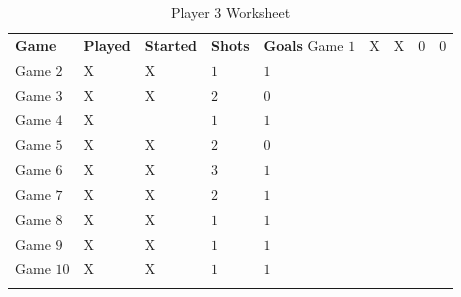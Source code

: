 \begin{table}[H]
	{\small
		\begin{longtable}{L{0.65in}C{0.45in}C{0.50in}C{0.40in}C{0.40in}} %
			\textbf{Game} & \textbf{Played} & \textbf{Started} & \textbf{Shots} & \textbf{Goals}\endhead
			Game $ 1  $ & X & X & $ 0 $ & $ 0 $ \\
			Game $ 2  $ & X & X & $ 1 $ & $ 1 $ \\
			Game $ 3  $ & X & X & $ 2 $ & $ 0 $ \\
			Game $ 4  $ & X &   & $ 1 $ & $ 1 $ \\
			Game $ 5  $ & X & X & $ 2 $ & $ 0 $ \\
			Game $ 6  $ & X & X & $ 3 $ & $ 1 $ \\
			Game $ 7  $ & X & X & $ 2 $ & $ 1 $ \\
			Game $ 8  $ & X & X & $ 1 $ & $ 1 $ \\
			Game $ 9  $ & X & X & $ 1 $ & $ 1 $ \\
			Game $ 10 $ & X & X & $ 1 $ & $ 1 $ \\
			\caption{Player 3 Worksheet}
			\label{06:tab05}
		\end{longtable}
	}
\end{table}

